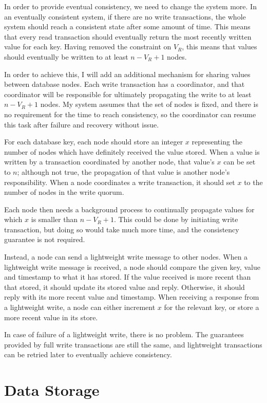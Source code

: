 \documentclass[12pt,a4paper,twoside,openright]{report}
\begin{document}
In order to provide eventual consistency, we need to change the system more. In an eventually consistent system, if there are no write transactions, the whole system should reach a consistent state after some amount of time. This means that every read transaction should eventually return the most recently written value for each key. Having removed the constraint on $V_R$, this means that values should eventually be written to at least $n - V_R + 1$ nodes.

In order to achieve this, I will add an additional mechanism for sharing values between database nodes. Each write transaction has a coordinator, and that coordinator will be responsible for ultimately propagating the write to at least $n - V_R + 1$ nodes. My system assumes that the set of nodes is fixed, and there is no requirement for the time to reach consistency, so the coordinator can resume this task after failure and recovery without issue.

For each database key, each node should store an integer $x$ representing the number of nodes which have definitely received the value stored.  When a value is written by a transaction coordinated by another node, that value's $x$ can be set to $n$; although not true, the propagation of that value is another node's responsibility. When a node coordinates a write transaction, it should set $x$ to the number of nodes in the write quorum.

Each node then needs a background process to continually propagate values for which $x$ is smaller than $n - V_R + 1$. This could be done by initiating write transaction, but doing so would take much more time, and the consistency guarantee is not required.

Instead, a node can send a lightweight write message to other nodes. When a lightweight write message is received, a node should compare the given key, value and timestamp to what it has stored. If the value received is more recent than that stored, it should update its stored value and reply. Otherwise, it should reply with its more recent value and timestamp. When receiving a response from a lightweight write, a node can either increment $x$ for the relevant key, or store a more recent value in its store.

In case of failure of a lightweight write, there is no problem. The guarantees provided by full write transactions are still the same, and lightweight transactions can be retried later to eventually achieve consistency.

\section{Data Storage}
\end{document}
